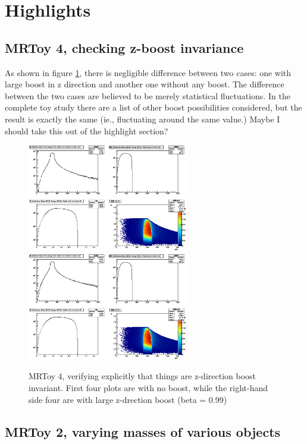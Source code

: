 \documentclass{fheadnote}
\begin{document}
\section{Highlights}

\subsection{MRToy 4, checking z-boost invariance}

As shown in figure \ref{Figure_MRToy4}, there is negligible difference between two cases: one with
large boost in z direction and another one without any boost.  The difference between the two
cases are believed to be merely statistical fluctuations.  In the complete toy study there are a list
of other boost possibilities considered, but the result is exactly the same (ie., fluctuating around
the same value.)  Maybe I should take this out of the highlight section?

\begin{figure}[htbp]
   \centering
   \includegraphics[width=7cm]{Figures/MRToy4_NoBoost}
   \includegraphics[width=7cm]{Figures/MRToy4_LargeBoost}
   \caption{MRToy 4, verifying explicitly that things are z-direction boost invariant.
   First four plots are with no boost, while the right-hand side four are with large z-drection boost
   (beta = 0.99)}
   \label{Figure_MRToy4}
\end{figure}

\subsection{MRToy 2, varying masses of various objects}
\end{document}
